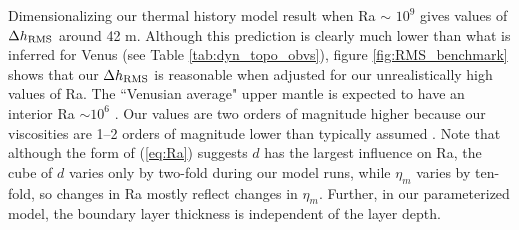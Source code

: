 %
%

Dimensionalizing our thermal history model result when Ra $\sim$ $10^9$ gives values of $\Delta h_{\rm RMS}$ around 42 m. Although this prediction is clearly much lower than what is inferred for Venus (see Table \ref{tab:dyn_topo_obvs}), figure \ref{fig:RMS_benchmark} shows that our $\Delta h_{\rm RMS}$ is reasonable when adjusted for our unrealistically high values of Ra. The ``Venusian average" upper mantle is expected to have an interior Ra $\sim 10^6$ \citep{Kiefer1998}. Our values are two orders of magnitude higher because our viscosities are 1--2 orders of magnitude lower than typically assumed \citep[cf.][]{Benesova2012}. Note that although the form of (\ref{eq:Ra}) suggests $d$ has the largest influence on Ra, the cube of $d$ varies only by two-fold during our model runs, while $\eta_m$ varies by ten-fold, so changes in Ra mostly reflect changes in $\eta_m$. Further, in our parameterized model, the boundary layer thickness is independent of the layer depth. %





